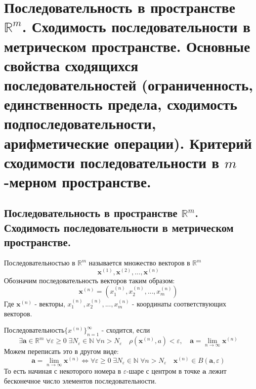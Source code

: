 \section{Последовательность в пространстве $\mathbb {R}^m$. Сходимость последовательности в метрическом пространстве. Основные свойства сходящихся последовательностей (ограниченность, единственность предела, сходимость подпоследовательности, арифметические операции). Критерий сходимости последовательности в $m$-мерном пространстве.}
\subsection{Последовательность в пространстве $\mathbb {R}^m$. Сходимость последовательности в метрическом пространстве.}
Последовательностью в $\mathbb {R}^m$ называется множество векторов в $\mathbb {R}^m$
$$
\textbf{x}^{(1)}, \textbf{x}^{(2)}, ..., \textbf{x}^{(n)}
$$
Обозначим последовательность векторов таким образом: 
$$ \textbf{x}^{(n)} = (x^{(n)}_1, x^{(n)}_2, ..., x^{(n)}_m)$$
Где $\textbf{x}^{(n)}$ - векторы, $x^{(n)}_1, x^{(n)}_2, ..., x^{(n)}_m$ - координаты соответствующих векторов.

Последовательность$\{x^{(n)}\}^{\infty}_{n=1}$ - сходится, если 
$$
\exists \textbf {a} \in \mathbb {R}^m \; \forall \varepsilon \geq 0 \; \exists N_{\varepsilon} \in \mathbb {N} \; \forall n > N_{\varepsilon} \quad \rho(\textbf{x}^{(n)}, a) < {\varepsilon}, \quad \textbf {a} = \lim_{n\to\infty}{\textbf{x}^{(n)}}
$$
Можем переписать это в другом виде: 
$$
\textbf {a} = \lim_{n\to\infty}{\textbf{x}^{(n)}} \Leftrightarrow \forall \varepsilon \geq 0 \; \exists N_{\varepsilon} \in \mathbb {N} \; \forall n > N_{\varepsilon} \quad \textbf{x}^{(n)} \in B(\textbf {a}, \varepsilon)
$$
То есть начиная с некоторого номера в $\varepsilon$-шаре с центром в точке $\textbf {a}$ лежит бесконечное число элементов последовательности.
